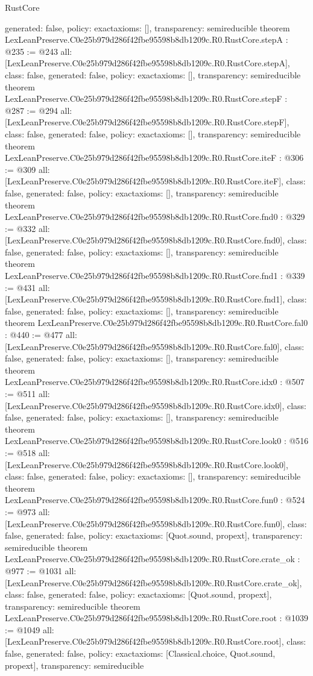 \begin{lexlean}{RustCore}
\begin{coremodule}
{  generated: false,
  policy: exact{axioms: []},
  transparency: semireducible
}
theorem LexLeanPreserve.C0e25b979d286f42fbe95598b8db1209c.R0.RustCore.stepA : @235 := @243 {
  all: [LexLeanPreserve.C0e25b979d286f42fbe95598b8db1209c.R0.RustCore.stepA],
  class: false,
  generated: false,
  policy: exact{axioms: []},
  transparency: semireducible
}
theorem LexLeanPreserve.C0e25b979d286f42fbe95598b8db1209c.R0.RustCore.stepF : @287 := @294 {
  all: [LexLeanPreserve.C0e25b979d286f42fbe95598b8db1209c.R0.RustCore.stepF],
  class: false,
  generated: false,
  policy: exact{axioms: []},
  transparency: semireducible
}
theorem LexLeanPreserve.C0e25b979d286f42fbe95598b8db1209c.R0.RustCore.iteF : @306 := @309 {
  all: [LexLeanPreserve.C0e25b979d286f42fbe95598b8db1209c.R0.RustCore.iteF],
  class: false,
  generated: false,
  policy: exact{axioms: []},
  transparency: semireducible
}
theorem LexLeanPreserve.C0e25b979d286f42fbe95598b8db1209c.R0.RustCore.fnd0 : @329 := @332 {
  all: [LexLeanPreserve.C0e25b979d286f42fbe95598b8db1209c.R0.RustCore.fnd0],
  class: false,
  generated: false,
  policy: exact{axioms: []},
  transparency: semireducible
}
theorem LexLeanPreserve.C0e25b979d286f42fbe95598b8db1209c.R0.RustCore.fnd1 : @339 := @431 {
  all: [LexLeanPreserve.C0e25b979d286f42fbe95598b8db1209c.R0.RustCore.fnd1],
  class: false,
  generated: false,
  policy: exact{axioms: []},
  transparency: semireducible
}
theorem LexLeanPreserve.C0e25b979d286f42fbe95598b8db1209c.R0.RustCore.fal0 : @440 := @477 {
  all: [LexLeanPreserve.C0e25b979d286f42fbe95598b8db1209c.R0.RustCore.fal0],
  class: false,
  generated: false,
  policy: exact{axioms: []},
  transparency: semireducible
}
theorem LexLeanPreserve.C0e25b979d286f42fbe95598b8db1209c.R0.RustCore.idx0 : @507 := @511 {
  all: [LexLeanPreserve.C0e25b979d286f42fbe95598b8db1209c.R0.RustCore.idx0],
  class: false,
  generated: false,
  policy: exact{axioms: []},
  transparency: semireducible
}
theorem LexLeanPreserve.C0e25b979d286f42fbe95598b8db1209c.R0.RustCore.look0 : @516 := @518 {
  all: [LexLeanPreserve.C0e25b979d286f42fbe95598b8db1209c.R0.RustCore.look0],
  class: false,
  generated: false,
  policy: exact{axioms: []},
  transparency: semireducible
}
theorem LexLeanPreserve.C0e25b979d286f42fbe95598b8db1209c.R0.RustCore.fun0 : @524 := @973 {
  all: [LexLeanPreserve.C0e25b979d286f42fbe95598b8db1209c.R0.RustCore.fun0],
  class: false,
  generated: false,
  policy: exact{axioms: [Quot.sound, propext]},
  transparency: semireducible
}
theorem LexLeanPreserve.C0e25b979d286f42fbe95598b8db1209c.R0.RustCore.crate_ok : @977 := @1031 {
  all: [LexLeanPreserve.C0e25b979d286f42fbe95598b8db1209c.R0.RustCore.crate_ok],
  class: false,
  generated: false,
  policy: exact{axioms: [Quot.sound, propext]},
  transparency: semireducible
}
theorem LexLeanPreserve.C0e25b979d286f42fbe95598b8db1209c.R0.RustCore.root : @1039 := @1049 {
  all: [LexLeanPreserve.C0e25b979d286f42fbe95598b8db1209c.R0.RustCore.root],
  class: false,
  generated: false,
  policy: exact{axioms: [Classical.choice, Quot.sound, propext]},
  transparency: semireducible
}


\end{coremodule}
\end{lexlean}
